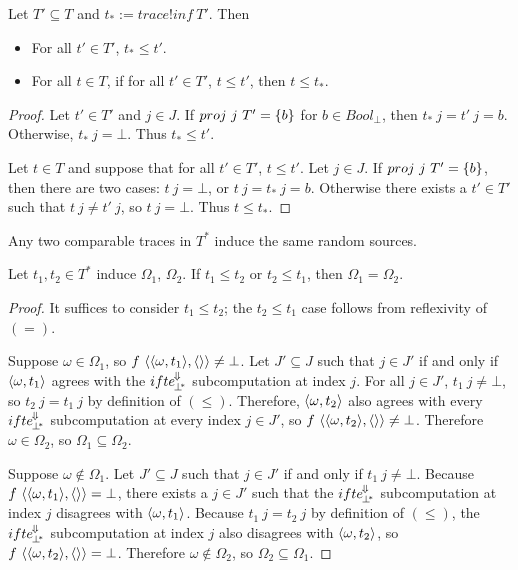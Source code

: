 \begin{theorem}
Let $T' \subseteq T$ and $t_* := trace!inf~T'$.
Then
\begin{itemize}
	\item For all $t' \in T'$, $t_* \leq t'$.
	\item For all $t \in T$, if for all $t' \in T'$, $t \leq t'$, then $t \leq t_*$.
\end{itemize}
\end{theorem}
\begin{proof}
Let $t' \in T'$ and $j \in J$.
If $proj~j~T' = \{{b}\}$ for $b \in Bool_\bot$, then $t_*~j = t'~j = b$.
Otherwise, $t_*~j = \bot$.
Thus $t_* \leq t'$.

Let $t \in T$ and suppose that for all $t' \in T'$, $t \leq t'$.
Let $j \in J$.
If $proj~j~T' = \{{b}\}$, then there are two cases: $t~j = \bot$, or $t~j = t_*~j = b$.
Otherwise there exists a $t' \in T'$ such that $t~j \neq t'~j$, so $t~j = \bot$.
Thus $t \leq t_*$.
\end{proof}

Any two comparable traces in $T^*$ induce the same random sources.

\begin{theorem}
\label{thm:comparable-implies-same-sources}
Let $t_1,t_2 \in T^*$ induce $\Omega_1$, $\Omega_2$.
If $t_1 \leq t_2$ or $t_2 \leq t_1$, then $\Omega_1 = \Omega_2$.
\end{theorem}
\begin{proof}
It suffices to consider $t_1 \leq t_2$; the $t_2 \leq t_1$ case follows from reflexivity of $(=)$.

Suppose $\omega \in \Omega_1$, so $f~\langle{\langle{\omega,t_1}\rangle,\langle{}\rangle}\rangle \neq \bot$.
Let $J' \subseteq J$ such that $j \in J'$ if and only if $\langle{\omega,t_1}\rangle$ agrees with the $ifte^{\mspace{-2mu}\Downarrow\mspace{-2mu}}_{\mspace{-2mu}{\bot^{\mspace{-4mu}*}}}$ subcomputation at index $j$.
For all $j \in J'$, $t_1~j \neq \bot$, so $t_2~j = t_1~j$ by definition of $(\leq)$.
Therefore, $\langle{\omega,t_2}\rangle$ also agrees with every $ifte^{\mspace{-2mu}\Downarrow\mspace{-2mu}}_{\mspace{-2mu}{\bot^{\mspace{-4mu}*}}}$ subcomputation at every index $j \in J'$, so $f~\langle{\langle{\omega,t_2}\rangle,\langle{}\rangle}\rangle \neq \bot$.
Therefore $\omega \in \Omega_2$, so $\Omega_1 \subseteq \Omega_2$.

Suppose $\omega \notin \Omega_1$.
Let $J' \subseteq J$ such that $j \in J'$ if and only if $t_1~j \neq \bot$.
Because $f~\langle{\langle{\omega,t_1}\rangle,\langle{}\rangle}\rangle = \bot$, there exists a $j \in J'$ such that the $ifte^{\mspace{-2mu}\Downarrow\mspace{-2mu}}_{\mspace{-2mu}{\bot^{\mspace{-4mu}*}}}$ subcomputation at index $j$ disagrees with $\langle{\omega,t_1}\rangle$.
Because $t_1~j = t_2~j$ by definition of $(\leq)$, the $ifte^{\mspace{-2mu}\Downarrow\mspace{-2mu}}_{\mspace{-2mu}{\bot^{\mspace{-4mu}*}}}$ subcomputation at index $j$ also disagrees with $\langle{\omega,t_2}\rangle$, so $f~\langle{\langle{\omega,t_2}\rangle,\langle{}\rangle}\rangle = \bot$.
Therefore $\omega \notin \Omega_2$, so $\Omega_2 \subseteq \Omega_1$.
\end{proof}

